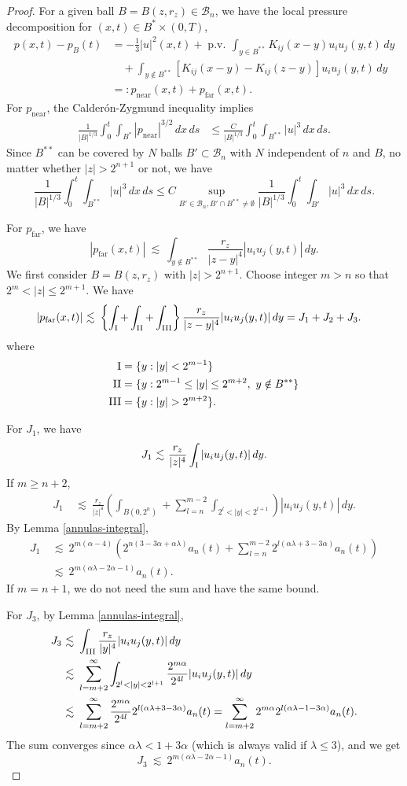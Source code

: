 \documentclass[11pt]{article}
\numberwithin{equation}{section}
\theoremstyle{remark}
\theoremstyle{definition}
\newcommand{\bke}[1]{\left ( #1 \right )}
\newcommand{\bkt}[1]{\left [ #1 \right ]}
\newcommand{\bket}[1]{\left \{ #1 \right \}}
\newcommand{\cB}{\mathcal{B}}
\newcommand{\lec}{{\ \lesssim \ }}
\newcommand\al{\alpha}
\newcommand\la{\lambda}
\newcommand{\pv} {\mathop{\mathrm{p.v.\!}}}
\newcommand{\Eq}[1]{\begin{equation*} #1 \end{equation*}}
\newcommand{\EQS}[1]{\begin{equation}\begin{split} #1 \end{split}\end{equation}}
\newcommand{\EQN}[1]{\begin{equation*}\begin{split} #1 \end{split}\end{equation*}}
\begin{document}
\begin{proof}
For a given ball $B=B(z,r_z)\in\cB_n$, we have the local pressure decomposition for $(x,t) \in B^* \times(0,T)$,
\EQS{
\label{EQ01}
p(x,t)-p_B(t) &=   - \frac 13 |u|^2(x,t) +\pv \int_{ y\in B^{**}}  K_{ij}(x-y)   u_i u_j(y,t)\,dy
\\&\quad
+  \int_{ y\notin B^{**}}  \bkt{ K_{ij}(x-y) - K_{ij}(z - y  )}  u_i u_j(y,t)\,dy
\\
& =: p_\text{near}(x,t)+ p_\text{far}(x,t).
}
For $p_\text{near}$, the Calder\'on-Zygmund inequality implies
\EQN{
\frac 1 {|B|^{1/3}} \int_0^t \int_{B^*} |p_\text{near}|^{3/2}\,dx\,ds
  &\leq
\frac C {|B|^{1/3}} \int_0^t \int_{B^{**}} |u|^3 \,dx\,ds.
}
Since $B^{**}$ can be covered by $N$ balls $B'\subset\cB_n$ with $N$ independent of $n$ and $B$, no matter whether
 $|z|>2^{n+1}$
%
or not, we have
%
  \[
       \frac 1 {|B|^{1/3}} \int_0^t \int_{B^{**}} |u|^3 \,dx\,ds
     \leq
      C \sup_{B'\in\cB_n,B'\cap B^{**}\neq \emptyset}\frac 1 {|B|^{1/3}}\int_0^t \int_{B'}|u|^3\,dx\,ds.
   \]

For $p_\text{far}$, we have
\Eq{
|p_\text{far}(x,t)| \lec
 \int_{ y\notin B^{**}}  \frac {r_z}{|z-y|^4}  |u_iu_j(y,t)|\,dy.
}
We first consider $B=B(z,r_z)$ with $|z|>2^{n+1}$. Choose integer $m > n$ so that $2^m < |z| \le 2^{m+1}$.
%
%
%
%
We have
\EQN{
|p_\text{far}(x,t)| &\lec
\bket{\int_{\textup{I} }+ \int_{ \textup{II} } + \int_{\textup{III} }} \frac {r_z}{|z-y|^4}  |u_iu_j(y,t)|\,dy = J_1+J_2+J_3.
}
where
\EQN{
\textup{I} &= \{ y: |y|<2^{m-1}\}
\\
\textup{II} &= \{ y: 2^{m-1}\le|y|\le 2^{m+2} ,\ y\notin B^{**}\}
\\
\textup{III} &= \{ y: |y|>2^{m+2}\}.
}

For $J_1$, we have
\[
J_1 \lec\frac {r_z}{|z|^4} \int_{\textup{I}}   |u_iu_j(y,t)|\,dy.
\]
%
%
If $m \ge n+2$,
\EQN{
J_1 &\lec\frac {r_z}{|z|^4} \bke{\int_{B(0,2^n)} +  \sum_{l=n}^{m-2}  \int_{2^l< |y|<2^{l+1}}}   |u_iu_j(y,t)|\,dy.
}
By Lemma \ref{annulas-integral},
\EQN{
J_1
& \lec 2^{m(\al-4)} \bke{2^{n(3-3\al+\al\la)}  a_n(t) +  \sum_{l=n}^{m-2} 2^{l(\al \la+3-3\al)}  a_n(t)   }
\\
& \lec  2^{m(\al \la -2\al-1)} a_n(t) .
}
If $m=n+1$, %
we do not need the sum and have the same bound.

%
%
%
%
%
%
%
%
%
%
%
%
%
%
%
For $J_3$, by Lemma \ref{annulas-integral},
\EQN{
J_3 &\lec\int_{\textup{III}}   \frac {r_z}{|y|^4}  |u_iu_j(y,t)|\,dy
\\
&\lec  \sum_{l=m+2}^{\infty}  \int_{2^l< |y|<2^{l+1}} \frac {2^{m\al}}{2^{4l}}  |u_iu_j(y,t)|\,dy
\\
& \lec  \sum_{l=m+2}^{\infty} \frac {2^{m\al}}{2^{4l}}   2^{l(\al \la+3-3\al)}    a_n(t) =  \sum_{l=m+2}^{\infty} 2^{m\al }  2^{l(\al \la-1-3\al)} a_n(t)
.
}
The sum converges since
$
\al \la < 1+ 3 \al$
(which is always valid if $\la \le 3$),
and we get
\[
J_3 \lec 2^{m(\al \la -2\al-1)} a_n(t) .
\]


\end{proof}
\end{document}
